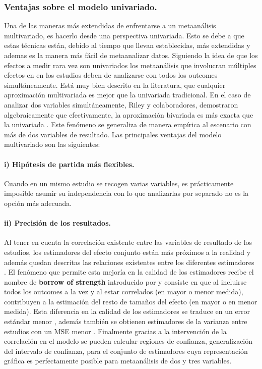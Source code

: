 \documentclass[a4paper,openright,12pt]{report}
\begin{document}
\subsubsection{Ventajas sobre el modelo univariado.}
Una de las maneras más extendidas de enfrentarse a un metaanálisis multivariado, es hacerlo desde una perspectiva univariada. Esto se debe a que estas técnicas están, debido al tiempo que llevan establecidas, más extendidas y ademas es la manera más fácil de metaanalizar datos.
Siguiendo la idea de que los efectos a medir rara vez son univariados \cite{Eysenck1994} los metaanálisis que involucran múltiples efectos en en los estudios deben de analizarse con todos los outcomes simultáneamente. Está muy bien descrito en la literatura, que cualquier aproximación multivariada es mejor que la univariada tradicional. En el caso de analizar dos variables simultáneamente, Riley y colaboradores, demostraron algebraicamente que efectivamente, la aproximación bivariada es más exacta que la univariada \cite{Riley2007}. Este fenómeno se generaliza de manera empírica al escenario con más de dos variables de resultado.
Las principales ventajas del modelo multivariado son las siguientes:
\paragraph{i) Hipótesis de partida más flexibles.} Cuando en un mismo estudio se recogen varias variables, es prácticamente imposible asumir su independencia \cite{Nam2003}\cite{Jackson2011}\cite{Riley2007} con lo que analizarlas por separado no es la opción más adecuada.
\paragraph{ii) Precisión de los resultados.} Al tener en cuenta la correlación existente entre las variables de resultado de los estudios, los estimadores del efecto conjunto están más próximos a la realidad y además quedan descritas las relaciones existentes entre los diferentes estimadores \cite{Jackson2011}. El fenómeno que permite esta mejoría en la calidad de los estimadores recibe el nombre de \textbf{borrow of strength} introducido por \cite{Higgins1996} y consiste en que al incluirse todos los outcomes a la vez y al estar correlados (en mayor o menor medida), contribuyen a la estimación del resto de tamaños del efecto (en mayor o en menor medida)\cite{Nam2003}\cite{Mavridis2011}. Esta diferencia en la calidad de los estimadores se traduce en un error estándar menor \cite{Riley2007}\cite{Jackson2011}, además también se obtienen estimadores de la varianza entre estudios con un MSE menor \cite{Jackson2011}. Finalmente gracias a la intervención de la correlación en el modelo se pueden calcular regiones de confianza, generalización del intervalo de confianza, para el conjunto de estimadores \cite{Jackson2011} cuya representación gráfica es perfectamente posible para metaanálisis de dos y tres variables.
\end{document}
